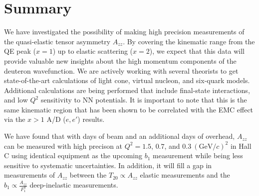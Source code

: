 \section{Summary}

We have investigated the possibility of making high precision measurements of the quasi-elastic tensor asymmetry $A_{zz}$.  By covering the kinematic range from the QE peak ($x=1$) up to elastic scattering ($x=2$), we expect that this data will provide valuable new insights about the high momentum components of the deuteron wavefunction. We are actively working with several theorists to get state-of-the-art calculations of light cone, virtual nucleon, and six-quark models. Additional calculations are being performed that include final-state interactions, and low $Q^2$ sensitivity to NN potentials.  It is important to note that this is the same kinematic region that has been shown to be correlated with the EMC effect via the $x>1$ A/D ($e,e'$) results. 

We have found that with \productiondays days of beam and an additional \overheaddays days of overhead, $A_{zz}$ can be measured with high precison at $Q^2=1.5$, $0.7$, and $0.3~(\mathrm{GeV}/c)^2$ in Hall C using identical equipment as the upcoming $b_1$ measurement while being less sensitive to systematic uncertainties. In addition, it will fill a gap in measurements of $A_{zz}$ between the $T_{20}\propto A_{zz}$ elastic measurements and the $b_1\propto \frac{A_{zz}}{F_1^d}$ deep-inelastic measurements.  

